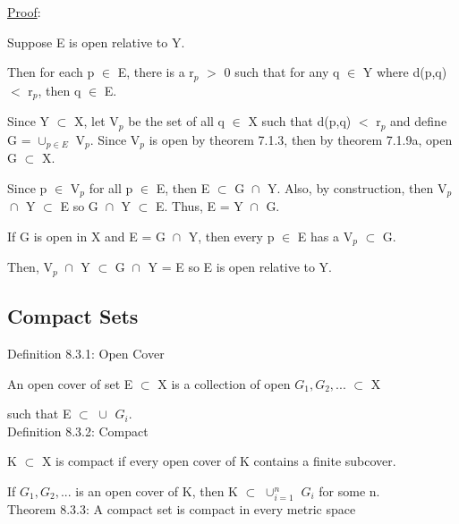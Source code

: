 { \color{magenta} \underline{Proof}: } 

	Suppose E is open relative to Y.

	Then for each p $\in$ E, there is a r$_p$ $>$ 0 such that for
	any q $\in$ Y where d(p,q) $<$ r$_p$, then q $\in$ E.
	
	Since Y $\subset$ X, let V$_p$ be the set of all q $\in$ X
	such that d(p,q) $<$ r$_p$ and define G = $\cup_{p \in E}^{}$ V$_p$.
	Since V$_p$ is open by {\color{red} theorem 7.1.3}, then by
	{\color{red} theorem 7.1.9a}, open G $\subset$ X.

	Since p $\in$ V$_p$ for all p $\in$ E, then E $\subset$ G $\cap_{}^{}$ Y.
	Also, by construction, then V$_p$ $\cap_{}^{}$ Y $\subset$ E so
	G $\cap_{}^{}$ Y $\subset$ E.
	Thus, E = Y $\cap_{}^{}$ G.

	If G is open in X and E = G $\cap_{}^{}$ Y, then every p $\in$ E has
	a V$_p$ $\subset$ G.

	Then, V$_p$ $\cap_{}^{}$ Y $\subset$ G $\cap_{}^{}$ Y = E so E is open relative to Y.
\newpage	





\subsection{ Compact Sets }

{ \color{blue} Definition 8.3.1: Open Cover } 

	\begin{adjustbox}{minipage=14cm, right, vspace=0.1cm 0cm}
		An open cover of set E $\subset$ X is a collection of open $G_1, G_2, ...$
		$\subset$ X
		
		such that E $\subset$ $\cup_{}^{}$ $G_i$. \\
	\end{adjustbox}

{ \color{blue} Definition 8.3.2: Compact } 

	\begin{adjustbox}{minipage=14cm, right, vspace=0.1cm 0cm}
		K $\subset$ X is compact if every open cover
		of K contains a finite subcover.

		\qquad If $G_1, G_2, ...$ is an open cover of K, then
		K $\subset$ $\cup_{i=1}^{n}$ $G_i$ for some n. \\
	\end{adjustbox}

{ \color{red} Theorem 8.3.3: A compact set is compact in every metric space } 

